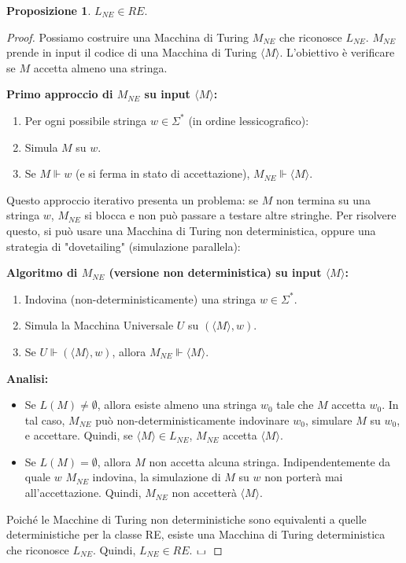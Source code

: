 \documentclass[a4paper]{article}
\newcommand{\blankS}{\ensuremath{\raisebox{-0.15ex}{\scalebox{1.3}[0.7]{$\sqcup$}}\mkern2mu}}
\theoremstyle{definition} %
\newtheorem{proposition}[theorem]{Proposizione}
\begin{document}
\begin{proposition}
$L_{NE} \in RE$.
\end{proposition}
\begin{proof}
Possiamo costruire una Macchina di Turing $M_{NE}$ che riconosce $L_{NE}$. $M_{NE}$ prende in input il codice di una Macchina di Turing $\langle M \rangle$. L'obiettivo è verificare se $M$ accetta almeno una stringa.

\textbf{Primo approccio di $M_{NE}$ su input $\langle M \rangle$:}
\begin{enumerate}
    \item Per ogni possibile stringa $w \in \Sigma^*$ (in ordine lessicografico):
    \item Simula $M$ su $w$.
    \item Se $M \Vdash w$ (e si ferma in stato di accettazione), $M_{NE} \Vdash \langle M \rangle$.
\end{enumerate}

Questo approccio iterativo presenta un problema: se $M$ non termina su una stringa $w$, $M_{NE}$ si blocca e non può passare a testare altre stringhe.
Per risolvere questo, si può usare una Macchina di Turing non deterministica, oppure una strategia di "dovetailing" (simulazione parallela):

\textbf{Algoritmo di $M_{NE}$ (versione non deterministica) su input $\langle M \rangle$:}
\begin{enumerate}
    \item Indovina (non-deterministicamente) una stringa $w \in \Sigma^*$.
    \item Simula la Macchina Universale $U$ su $(\langle M \rangle, w)$.
    \item Se $U \Vdash (\langle M \rangle, w)$, allora $M_{NE} \Vdash \langle M \rangle$.
\end{enumerate}

\textbf{Analisi:}
\begin{itemize}
    \item Se $L(M) \neq \emptyset$, allora esiste almeno una stringa $w_0$ tale che $M$ accetta $w_0$. In tal caso, $M_{NE}$ può non-deterministicamente indovinare $w_0$, simulare $M$ su $w_0$, e accettare. Quindi, se $\langle M \rangle \in L_{NE}$, $M_{NE}$ accetta $\langle M \rangle$.
    \item Se $L(M) = \emptyset$, allora $M$ non accetta alcuna stringa. Indipendentemente da quale $w$ $M_{NE}$ indovina, la simulazione di $M$ su $w$ non porterà mai all'accettazione. Quindi, $M_{NE}$ non accetterà $\langle M \rangle$.
\end{itemize}
Poiché le Macchine di Turing non deterministiche sono equivalenti a quelle deterministiche per la classe RE, esiste una Macchina di Turing deterministica che riconosce $L_{NE}$. Quindi, $L_{NE} \in RE$.
$\blankS$
\end{proof}
\end{document}
